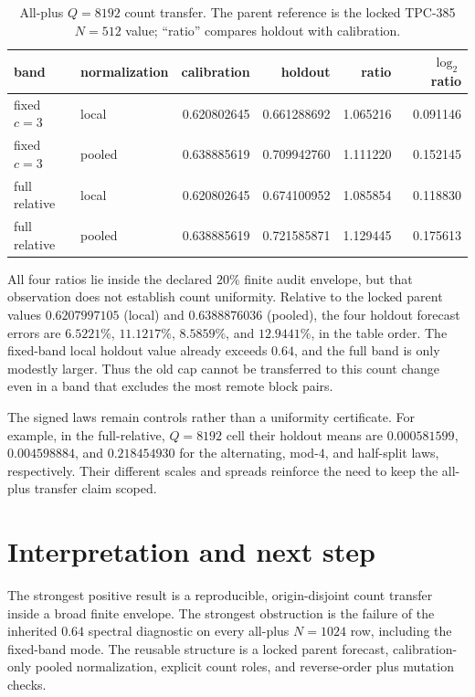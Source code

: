 \documentclass[10pt]{article}
\begin{document}
\begin{table}[t]
\centering
\caption{All-plus $Q=8192$ count transfer.  The parent reference is the
locked TPC-385 $N=512$ value; ``ratio'' compares holdout with calibration.}
\small
\begin{tabular}{@{}l l r r r r@{}}
\toprule
band & normalization & calibration & holdout & ratio & $\log_2$ ratio\\
\midrule
fixed $c=3$ & local & 0.620802645 & 0.661288692 & 1.065216 & 0.091146\\
fixed $c=3$ & pooled & 0.638885619 & 0.709942760 & 1.111220 & 0.152145\\
full relative & local & 0.620802645 & 0.674100952 & 1.085854 & 0.118830\\
full relative & pooled & 0.638885619 & 0.721585871 & 1.129445 & 0.175613\\
\bottomrule
\end{tabular}
\end{table}

All four ratios lie inside the declared $20\%$ finite audit envelope, but
that observation does not establish count uniformity.  Relative to the
locked parent values $0.6207997105$ (local) and $0.6388876036$ (pooled), the
four holdout forecast errors are $6.5221\%$, $11.1217\%$, $8.5859\%$, and
$12.9441\%$, in the table order.  The fixed-band local holdout value already
exceeds $0.64$, and the full band is only modestly larger.  Thus the old cap
cannot be transferred to this count change even in a band that excludes the
most remote block pairs.

The signed laws remain controls rather than a uniformity certificate.  For
example, in the full-relative, $Q=8192$ cell their holdout means are
$0.000581599$, $0.004598884$, and $0.218454930$ for the alternating,
mod-$4$, and half-split laws, respectively.  Their different scales and
spreads reinforce the need to keep the all-plus transfer claim scoped.

\section{Interpretation and next step}

The strongest positive result is a reproducible, origin-disjoint count
transfer inside a broad finite envelope.  The strongest obstruction is the
failure of the inherited $0.64$ spectral diagnostic on every all-plus
$N=1024$ row, including the fixed-band mode.  The reusable structure is a
locked parent forecast, calibration-only pooled normalization, explicit
count roles, and reverse-order plus mutation checks.
\end{document}
